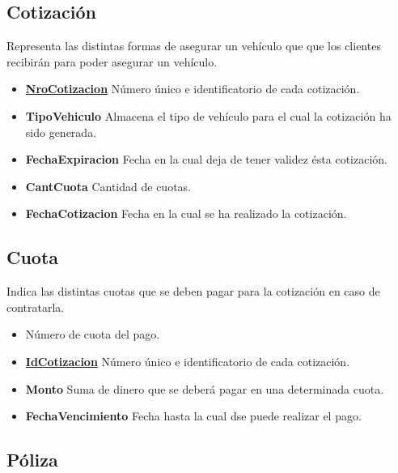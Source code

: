 \documentclass[a4paper,11pt]{article}
\begin{document}
\subsection{Cotización}

Representa las distintas formas de asegurar un vehículo que  que los clientes recibirán para poder asegurar
un vehículo.

\begin{itemize}

  \item \textbf{\uline{NroCotizacion}} Número único e identificatorio de cada cotización.
  
  \item \textbf{TipoVehiculo} Almacena el tipo de vehículo para el cual la cotización ha sido generada.

  \item \textbf{FechaExpiracion} Fecha en la cual deja de tener validez ésta cotización.
  
  \item \textbf{CantCuota} Cantidad de cuotas.

  \item \textbf{FechaCotizacion} Fecha en la cual se ha realizado la cotización.
      
\end{itemize}

\subsection{Cuota}

Indica las distintas cuotas que se deben pagar para la cotización en caso de contratarla.

\begin{itemize}

  \item \textbf{} Número de cuota del pago.
    
  \item \textbf{\uline{IdCotizacion}} Número único e identificatorio de cada cotización.
  
  \item \textbf{Monto} Suma de dinero que se deberá pagar en una determinada cuota.

  \item \textbf{FechaVencimiento} Fecha hasta la cual dse puede realizar el pago.

\end{itemize}

\subsection{Póliza}
\end{document}
